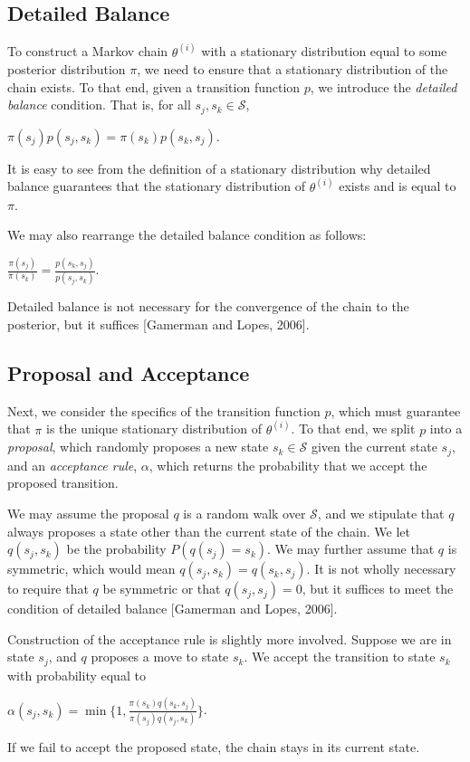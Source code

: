 \documentclass[12pt,twoside]{reedthesis}
\begin{document}
		\subsection*{Detailed Balance}
			To construct a Markov chain $\theta^{(i)}$ with a stationary distribution equal to some posterior distribution $\pi$, 
			we need to ensure that a stationary distribution of the chain exists. 
			To that end, given a transition function $p$, we introduce the {\em detailed balance} condition. 
			That is, for all $s_j, s_k \in \mathcal S$,
			\begin{center}
				$ \pi(s_j) p(s_j,s_k) = \pi(s_k) p(s_k,s_j)$.
			\end{center}
			It is easy to see from the definition of a stationary distribution why detailed balance guarantees that the stationary distribution of $\theta^{(i)}$ exists and is equal to $\pi$. 
			
			We may also rearrange the detailed balance condition as follows:
			\begin{center}
				$\displaystyle \frac{\pi(s_j)}{\pi(s_k)} = \frac{p(s_k, s_j)}{p(s_j, s_k)}$.
			\end{center}
			Detailed balance is not necessary for the convergence of the chain to the posterior, but it suffices [Gamerman and Lopes, 2006]. 
		\subsection*{Proposal and Acceptance}
			Next, we consider the specifics of the transition function $p$, which must guarantee that $\pi$ is the unique stationary distribution of $\theta^{(i)}$.
			To that end, we split $p$ into a {\em proposal}, which randomly proposes a new state $s_k \in\mathcal S$ given the current state $s_j$, and an {\em acceptance rule}, $\alpha$, which returns the probability that we accept the proposed transition.
			
			We may assume the proposal $q$ is a random walk over $\mathcal S$, 
			and we stipulate that $q$ always proposes a state other than the current state of the chain.
			We let $q(s_j,s_k)$ be the probability $P(q(s_j) = s_k)$.
			We may further assume that $q$ is symmetric, which would mean $q(s_j,s_k) = q(s_k,s_j)$.
			It is not wholly necessary to require that $q$ be symmetric or that $q(s_j,s_j) = 0$, but it suffices to meet the condition of detailed balance [Gamerman and Lopes, 2006].
			
			Construction of the acceptance rule is slightly more involved. 
			Suppose we are in state $s_j$, and $q$ proposes a move to state $s_k$. 
			We accept the transition to state $s_k$ with probability equal to
			\begin{center}
			$ \alpha(s_j,s_k) = \min\{1, \frac{\pi(s_k)q(s_k, s_j)}{\pi(s_j)q(s_j, s_k)}\}$.
			\end{center}
			If we fail to accept the proposed state, the chain stays in its current state.
			
\end{document}
